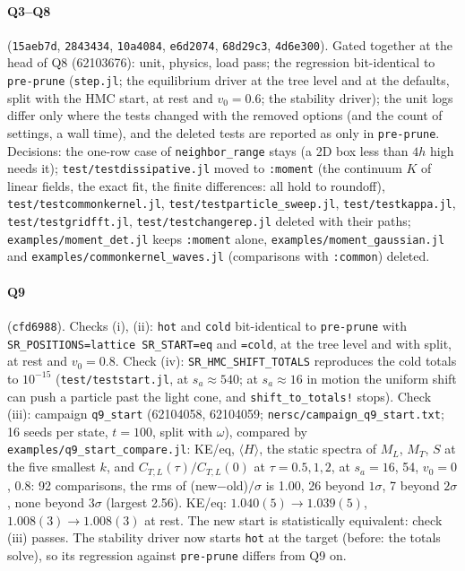 \documentclass[11pt,aps,preprint,nofootinbib,superscriptaddress,tightenlines]{revtex4-2}
\let\oldparagraph\paragraph
\renewcommand{\paragraph}{\par\bigskip\oldparagraph}
\begin{document}
\paragraph{Q3--Q8} (\texttt{15aeb7d}, \texttt{2843434}, \texttt{10a4084}, \texttt{e6d2074}, \texttt{68d29c3}, \texttt{4d6e300}).  Gated
together at the head of Q8 (62103676): unit, physics, load pass; the regression bit-identical to \texttt{pre-prune} (\texttt{step.jl};
the equilibrium driver at the tree level and at the defaults, split with the HMC start, at rest and $v_0=0.6$; the stability driver);
the unit logs differ only where the tests changed with the removed options (and the count of settings, a wall time), and the deleted
tests are reported as only in \texttt{pre-prune}.  Decisions: the one-row case of \texttt{neighbor\_range} stays (a 2D box less than $4h$ high
needs it); \nolinkurl{test/testdissipative.jl} moved to \texttt{:moment} (the continuum $K$ of linear fields, the exact fit, the finite
differences: all hold to roundoff), \nolinkurl{test/testcommonkernel.jl}, \nolinkurl{test/testparticle_sweep.jl},
\nolinkurl{test/testkappa.jl}, \nolinkurl{test/testgridfft.jl}, \nolinkurl{test/testchangerep.jl} deleted with their paths;
\nolinkurl{examples/moment_det.jl} keeps \texttt{:moment} alone, \nolinkurl{examples/moment_gaussian.jl} and
\nolinkurl{examples/commonkernel_waves.jl} (comparisons with \texttt{:common}) deleted.

\paragraph{Q9} (\texttt{cfd6988}).  Checks (i), (ii): \texttt{hot} and \texttt{cold} bit-identical to \texttt{pre-prune} with
\texttt{SR\_POSITIONS=lattice SR\_START=eq} and \texttt{=cold}, at the tree level and with split, at rest and $v_0=0.8$.  Check (iv):
\texttt{SR\_HMC\_SHIFT\_TOTALS} reproduces the cold totals to $10^{-15}$ (\nolinkurl{test/teststart.jl}, at $s_a\approx540$; at $s_a\approx16$
in motion the uniform shift can push a particle past the light cone, and \texttt{shift\_to\_totals!} stops).  Check (iii): campaign
\texttt{q9\_start} (62104058, 62104059; \nolinkurl{nersc/campaign_q9_start.txt}; 16 seeds per state, $t=100$, split with $\omega$),
compared by \nolinkurl{examples/q9_start_compare.jl}: KE/eq, $\langle H\rangle$, the static spectra of $M_L$, $M_T$, $S$ at the five
smallest $k$, and $C_{T,L}(\tau)/C_{T,L}(0)$ at $\tau=0.5,1,2$, at $s_a=16$, 54, $v_0=0$, 0.8: 92 comparisons, the rms of
(new$-$old)$/\sigma$ is 1.00, 26 beyond $1\sigma$, 7 beyond $2\sigma$, none beyond $3\sigma$ (largest 2.56).  KE/eq: $1.040(5)\to1.039(5)$,
$1.008(3)\to1.008(3)$ at rest.  The new start is statistically equivalent: check (iii) passes.  The stability driver now starts \texttt{hot} at the
target (before: the totals solve), so its regression against \texttt{pre-prune} differs from Q9 on.
\end{document}
